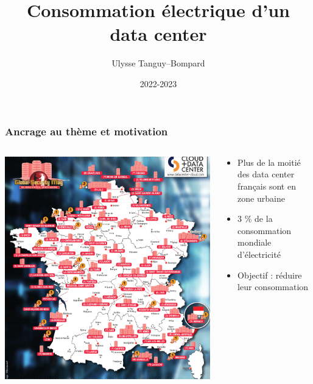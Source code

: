 \documentclass[a4paper,11pt]{beamer}
\title{Consommation électrique d'un data center}
\author{Ulysse Tanguy--Bompard}
\institute{Candidat n° 15937}
\date{2022-2023}
\begin{document}

\maketitle %


\begin{frame}
    \frametitle{Ancrage au thème et motivation}

    \begin{columns}
        \begin{column}{0.5\textwidth}
            \includegraphics[width=\textwidth]{carte_data_center.png}
        \end{column}
        \begin{column}{0.5\textwidth}
            \begin{itemize}
                \item Plus de la moitié des data center français sont en zone urbaine
                \item 3 \% de la consommation mondiale d'électricité
                \item Objectif : réduire leur consommation
            \end{itemize}
        \end{column}
    \end{columns}
\end{frame}
\end{document}

